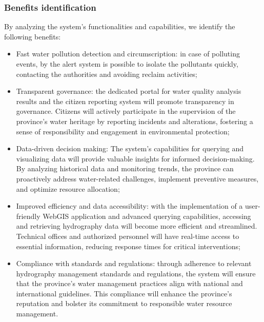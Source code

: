 \subsubsection{Benefits identification}
By analyzing the system's functionalities and capabilities, we identify the following benefits:
\begin{itemize}
    \item Fast water pollution detection and circumscription: in case of polluting events, by the alert system is possible to isolate the pollutants quickly, contacting the authorities and avoiding reclaim activities;
    \item Transparent governance: the dedicated portal for water quality analysis results and the citizen reporting system will promote transparency in governance. Citizens will actively participate in the supervision of the province's water heritage by reporting incidents and alterations, fostering a sense of responsibility and engagement in environmental protection;
    \item Data-driven decision making: The system's capabilities for querying and visualizing data will provide valuable insights for informed decision-making. By analyzing historical data and monitoring trends, the province can proactively address water-related challenges, implement preventive measures, and optimize resource allocation;
    \item Improved efficiency and data accessibility: with the implementation of a user-friendly WebGIS application and advanced querying capabilities, accessing and retrieving hydrography data will become more efficient and streamlined. Technical offices and authorized personnel will have real-time access to essential information, reducing response times for critical interventions;
    \item Compliance with standards and regulations: through adherence to relevant hydrography management standards and regulations, the system will ensure that the province's water management practices align with national and international guidelines. This compliance will enhance the province's reputation and bolster its commitment to responsible water resource management.
\end{itemize}

